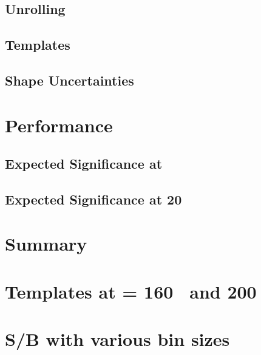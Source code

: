 \documentclass{cmspaper}
\begin{document}
  \subsection{Unrolling}
  \label{sec:unrolling}
  
  
  \subsection{Templates}
  \label{sec:templates}
  
  
  \subsection{Shape Uncertainties}
  \label{sec:shape_uncert}
  

%
\newpage
\section{Performance}
  \label{sec:performance}
  
  
  \subsection{Expected Significance at \intlumiEightTeV }
  \label{sec:exp_significance_5fb}
  
  
  \newpage
  \subsection{Expected Significance at 20~\ifb }
  \label{sec:exp_significance_20fb}
  

%
\newpage
\section{Summary}
     \label{sec:summary}
     



\clearpage 
\appendix
\appendixpage
  \section{Templates at \mHi = 160 \GeV~and 200 \GeV}
     \label{app:templates_160_200}
     
  
  \newpage
  \section{S/B with various bin sizes}
     \label{app:binsize}
     
\end{document}
